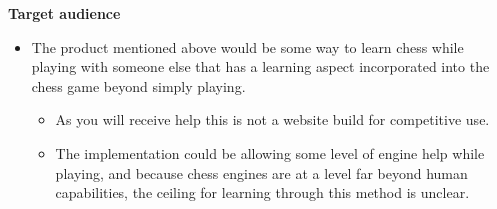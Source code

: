 \textbf{Target audience}

\begin{itemize}
    \item The product mentioned above would be some way to learn chess
    while playing with someone else that has a learning aspect incorporated into the chess game beyond simply playing.
    \begin{itemize}
        \item As you will receive help this is not a website build for competitive use.
        \item The implementation could be allowing some level of engine help while playing, and because chess
        engines are at a level far beyond human capabilities, the ceiling for learning through this method is unclear.
    \end{itemize}
\end{itemize}
